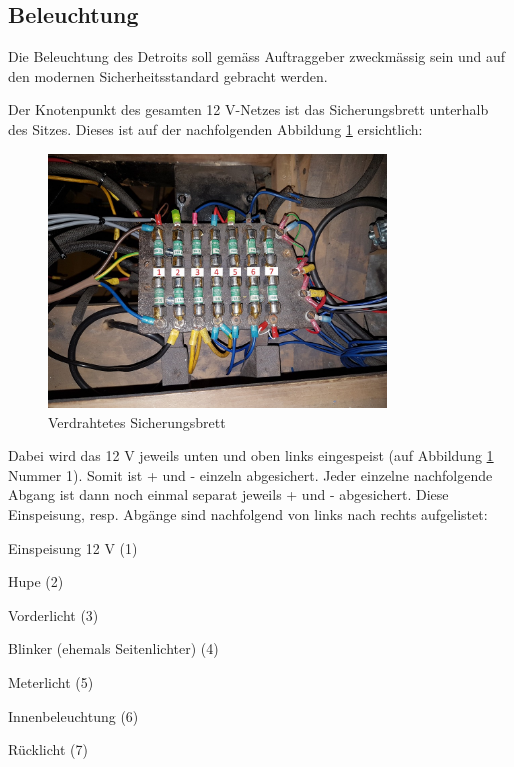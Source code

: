 \subsection{Beleuchtung}

Die Beleuchtung des Detroits soll gemäss Auftraggeber zweckmässig sein und auf den modernen Sicherheitsstandard gebracht werden.

\color{blue}
Der Knotenpunkt des gesamten 12 V-Netzes ist das Sicherungsbrett unterhalb des Sitzes. Dieses ist auf der nachfolgenden Abbildung \ref{fig:Sicherungsbrett} ersichtlich:

\begin{figure}[h!]
	\centering
		\includegraphics[width=0.8\textwidth]{images/Sicherungsbrett}
	\caption{Verdrahtetes Sicherungsbrett}
	\label{fig:Sicherungsbrett}
\end{figure}

\newpage
Dabei wird das 12 V jeweils unten und oben links eingespeist (auf Abbildung \ref{fig:Sicherungsbrett} Nummer 1). Somit ist + und - einzeln abgesichert. Jeder einzelne nachfolgende Abgang ist dann noch einmal separat jeweils + und - abgesichert. Diese Einspeisung, resp. Abgänge sind nachfolgend von links nach rechts aufgelistet:

\begin{compactitem}
\item Einspeisung 12 V (1)
\item Hupe (2)
\item Vorderlicht (3)
\item Blinker (ehemals Seitenlichter) (4)
\item Meterlicht (5)
\item Innenbeleuchtung (6)
\item Rücklicht (7)
\end{compactitem}

